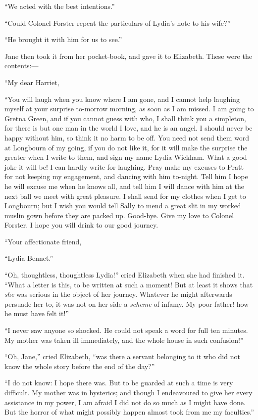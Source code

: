 \documentclass[12pt,openright]{book}
\begin{document}
“We acted with the best intentions.”

“Could Colonel Forster repeat the particulars of Lydia’s note to his wife?”

“He brought it with him for us to see.”

Jane then took it from her pocket-book, and gave it to Elizabeth. These were the contents:—

“My dear Harriet,

“You will laugh when you know where I am gone, and I cannot help laughing myself at your surprise to-morrow morning, as soon as I am missed. I am going to Gretna Green, and if you cannot guess with who, I shall think you a simpleton, for there is but one man in the world I love, and he is an angel. I should never be happy without him, so think it no harm to be off. You need not send them word at Longbourn of my going, if you do not like it, for it will make the surprise the greater when I write to them, and sign my name Lydia Wickham. What a good joke it will be! I can hardly write for laughing. Pray make my excuses to Pratt for not keeping my engagement, and dancing with him to-night. Tell him I hope he will excuse me when he knows all, and tell him I will dance with him at the next ball we meet with great pleasure. I shall send for my clothes when I get to Longbourn; but I wish you would tell Sally to mend a great slit in my worked muslin gown before they are packed up. Good-bye. Give my love to Colonel Forster. I hope you will drink to our good journey.

“Your affectionate friend,

“Lydia Bennet.”


“Oh, thoughtless, thoughtless Lydia!” cried Elizabeth when she had finished it. “What a letter is this, to be written at such a moment! But at least it shows that \textit{she} was serious in the object of her journey. Whatever he might afterwards persuade her to, it was not on her side a \textit{scheme} of infamy. My poor father! how he must have felt it!”

“I never saw anyone so shocked. He could not speak a word for full ten minutes. My mother was taken ill immediately, and the whole house in such confusion!”

“Oh, Jane,” cried Elizabeth, “was there a servant belonging to it who did not know the whole story before the end of the day?”

“I do not know: I hope there was. But to be guarded at such a time is very difficult. My mother was in hysterics; and though I endeavoured to give her every assistance in my power, I am afraid I did not do so much as I might have done. But the horror of what might possibly happen almost took from me my faculties.”
\end{document}
